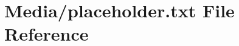\hypertarget{placeholder_8txt}{}\section{Media/placeholder.txt File Reference}
\label{placeholder_8txt}
